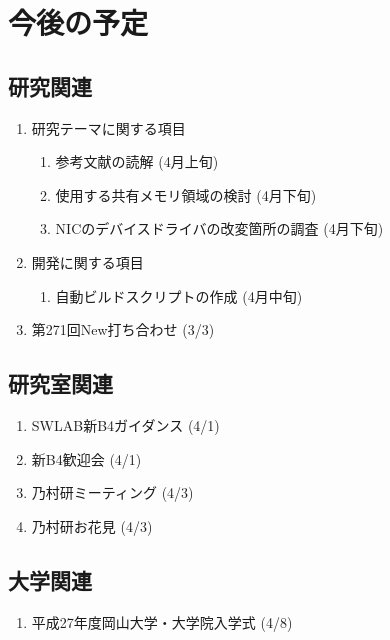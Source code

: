 \documentclass[fleqn, 14pt]{extarticle}
\begin{document}
\section{今後の予定}
\label{sec-4}
\subsection{研究関連}
\label{sec-4-1}

\begin{enumerate}
\item 研究テーマに関する項目
\hfill
\begin{enumerate}


\item 参考文献の読解
\hfill
(4月上旬)

\item 使用する共有メモリ領域の検討
\hfill
(4月下旬)

\item NICのデバイスドライバの改変箇所の調査
\hfill
(4月下旬)

\end{enumerate}
\item 開発に関する項目
\hfill
\begin{enumerate}

\item 自動ビルドスクリプトの作成
\hfill
(4月中旬)

\end{enumerate}
\item 第271回New打ち合わせ
\hfill
\label{enum-7}
(3/3)
\end{enumerate}

\subsection{研究室関連}
\label{sec-4-2}

\begin{enumerate}

\item SWLAB新B4ガイダンス
\hfill
\label{enum-18}
(4/1)

\item 新B4歓迎会 
\hfill
\label{enum-18}
(4/1)

\item 乃村研ミーティング 
\hfill
\label{enum-18}
(4/3)


\item 乃村研お花見 
\hfill
\label{enum-18}
(4/3)
\end{enumerate}

\subsection{大学関連}
\begin{enumerate}

\item 平成27年度岡山大学・大学院入学式
\hfill
\label{enum-17}
(4/8)


\end{enumerate}
\end{document}
